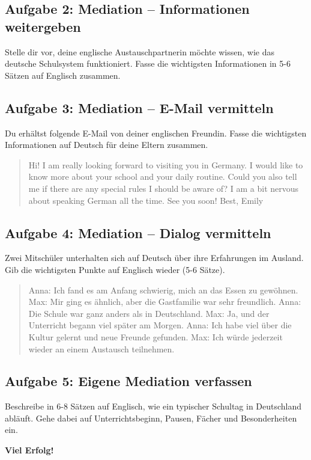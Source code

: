 \subsection*{Aufgabe 2: Mediation – Informationen weitergeben}
Stelle dir vor, deine englische Austauschpartnerin möchte wissen, wie das deutsche Schulsystem funktioniert. Fasse die wichtigsten Informationen in 5-6 Sätzen auf Englisch zusammen.

\subsection*{Aufgabe 3: Mediation – E-Mail vermitteln}
Du erhältst folgende E-Mail von deiner englischen Freundin. Fasse die wichtigsten Informationen auf Deutsch für deine Eltern zusammen.

\begin{quote}
Hi! I am really looking forward to visiting you in Germany. I would like to know more about your school and your daily routine. Could you also tell me if there are any special rules I should be aware of? I am a bit nervous about speaking German all the time. See you soon!\newline
Best,\newline
Emily
\end{quote}

\subsection*{Aufgabe 4: Mediation – Dialog vermitteln}
Zwei Mitschüler unterhalten sich auf Deutsch über ihre Erfahrungen im Ausland. Gib die wichtigsten Punkte auf Englisch wieder (5-6 Sätze).

\begin{quote}
Anna: Ich fand es am Anfang schwierig, mich an das Essen zu gewöhnen.\newline
Max: Mir ging es ähnlich, aber die Gastfamilie war sehr freundlich.\newline
Anna: Die Schule war ganz anders als in Deutschland.\newline
Max: Ja, und der Unterricht begann viel später am Morgen.\newline
Anna: Ich habe viel über die Kultur gelernt und neue Freunde gefunden.\newline
Max: Ich würde jederzeit wieder an einem Austausch teilnehmen.
\end{quote}

\subsection*{Aufgabe 5: Eigene Mediation verfassen}
Beschreibe in 6-8 Sätzen auf Englisch, wie ein typischer Schultag in Deutschland abläuft. Gehe dabei auf Unterrichtsbeginn, Pausen, Fächer und Besonderheiten ein.

\vspace{1cm}
\textbf{Viel Erfolg!}
